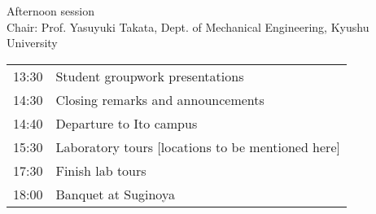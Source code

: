 \noindent Afternoon session \\
Chair: Prof. Yasuyuki Takata, Dept. of Mechanical Engineering, Kyushu University

\noindent\begin{tabular}{|l|l|}
    \hline
    13:30   & Student groupwork presentations \\
    14:30   & Closing remarks and announcements \\
    14:40   & Departure to Ito campus \\
    15:30   & Laboratory tours [locations to be mentioned here] \\
    17:30   & Finish lab tours \\
    18:00   & Banquet at Suginoya \\
    \hline
\end{tabular}
